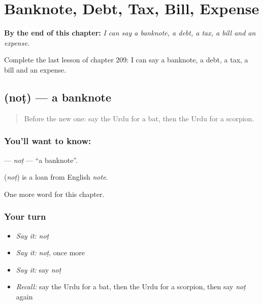 
\chapter{Banknote, Debt, Tax, Bill, Expense}
\label{ch:ur-banknote-debt-tax-bill-expense}

\begin{chapteropening}
\textbf{By the end of this chapter:} \emph{I can say a banknote, a debt, a tax, a bill and an expense.}

Complete the last lesson of chapter 209: I can say a banknote, a debt, a tax, a bill and an expense.
\end{chapteropening}

\section[\texorpdfstring{\ur{نوٹ} (noṭ)}{نوٹ (noṭ)}]{ (noṭ) — a banknote}

\label{lesson:UR-C209-not}



\begin{quote}
Before the new one: say the Urdu for a bat, then the Urdu for a scorpion.
\end{quote}

\subsection*{You'll want to know: }
\textbf{} — \emph{noṭ} — \textquotedblleft{}a banknote\textquotedblright{}.

\begin{cousinweb}
\textbf{} (\emph{noṭ}) is a loan from English \emph{note}.
\end{cousinweb}

\begin{grammarlens}[title={What you've built}]
One more word for this chapter.
\end{grammarlens}

\subsection*{Your turn}
\begin{itemize}
\raggedright
  \item \emph{Say it:} \emph{noṭ}
  \item \emph{Say it:} \emph{noṭ}, once more
  \item \emph{Say it:} say \emph{noṭ}
  \item \emph{Recall:} say the Urdu for a bat, then the Urdu for a scorpion, then say \emph{noṭ} again
\end{itemize}

